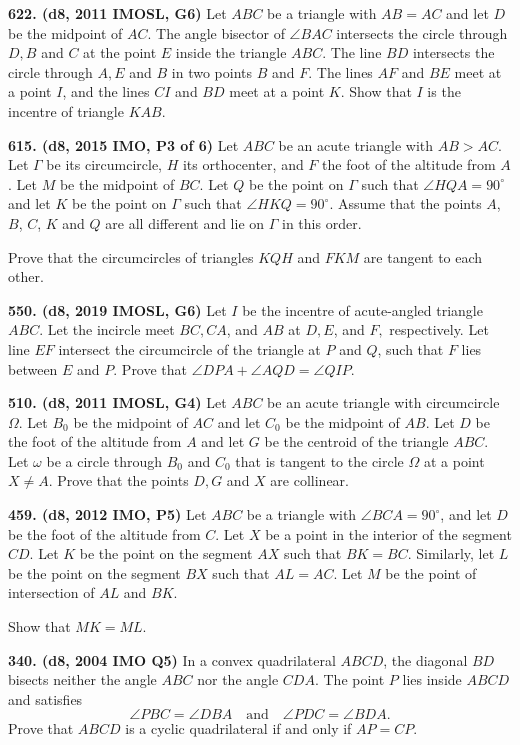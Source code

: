 \documentclass{article}
\begin{document}
\textbf{622. (\color{red}d8\color{black}, 2011 IMOSL, G6)} Let $ABC$ be a triangle with $AB=AC$ and let $D$ be the midpoint of $AC$. The angle bisector of $\angle BAC$ intersects the circle through $D,B$ and $C$ at the point $E$ inside the triangle $ABC$. The line $BD$ intersects the circle through $A,E$ and $B$ in two points $B$ and $F$. The lines $AF$ and $BE$ meet at a point $I$, and the lines $CI$ and $BD$ meet at a point $K$. Show that $I$ is the incentre of triangle $KAB$.


\textbf{615. (\color{red}d8\color{black}, 2015 IMO, P3 of 6)} Let $ABC$ be an acute triangle with $AB > AC$. Let $\Gamma $ be its circumcircle, $H$ its orthocenter, and $F$ the foot of the altitude from $A$. Let $M$ be the midpoint of $BC$. Let $Q$ be the point on $\Gamma$ such that $\angle HQA = 90^{\circ}$ and let $K$ be the point on $\Gamma$ such that $\angle HKQ = 90^{\circ}$. Assume that the points $A$, $B$, $C$, $K$ and $Q$ are all different and lie on $\Gamma$ in this order.

Prove that the circumcircles of triangles $KQH$ and $FKM$ are tangent to each other.

\textbf{550. (\color{red}d8\color{black}, 2019 IMOSL, G6)} Let $I$ be the incentre of acute-angled triangle $ABC$. Let the incircle meet $BC, CA$, and $AB$ at $D, E$, and $F,$ respectively. Let line $EF$ intersect the circumcircle of the triangle at $P$ and $Q$, such that $F$ lies between $E$ and $P$. Prove that $\angle DPA + \angle AQD =\angle QIP$.

\textbf{510. (\color{red}d8\color{black}, 2011 IMOSL, G4)} Let $ABC$ be an acute triangle with circumcircle $\Omega$. Let $B_0$ be the midpoint of $AC$ and let $C_0$ be the midpoint of $AB$. Let $D$ be the foot of the altitude from $A$ and let $G$ be the centroid of the triangle $ABC$. Let $\omega$ be a circle through $B_0$ and $C_0$ that is tangent to the circle $\Omega$ at a point $X\not= A$. Prove that the points $D,G$ and $X$ are collinear.

\textbf{459. (\color{red}d8\color{black}, 2012 IMO, P5)} Let $ABC$ be a triangle with $\angle BCA=90^{\circ}$, and let $D$ be the foot of the altitude from $C$. Let $X$ be a point in the interior of the segment $CD$. Let $K$ be the point on the segment $AX$ such that $BK=BC$. Similarly, let $L$ be the point on the segment $BX$ such that $AL=AC$. Let $M$ be the point of intersection of $AL$ and $BK$.

Show that $MK=ML$.

\textbf{340. (\color{red}d8\color{black}, 2004 IMO Q5)} In a convex quadrilateral $ABCD$, the diagonal $BD$ bisects neither the angle $ABC$ nor the angle $CDA$. The point $P$ lies inside $ABCD$ and satisfies\[\angle PBC=\angle DBA\quad\text{and}\quad \angle PDC=\angle BDA.\]Prove that $ABCD$ is a cyclic quadrilateral if and only if $AP=CP$.
\end{document}
